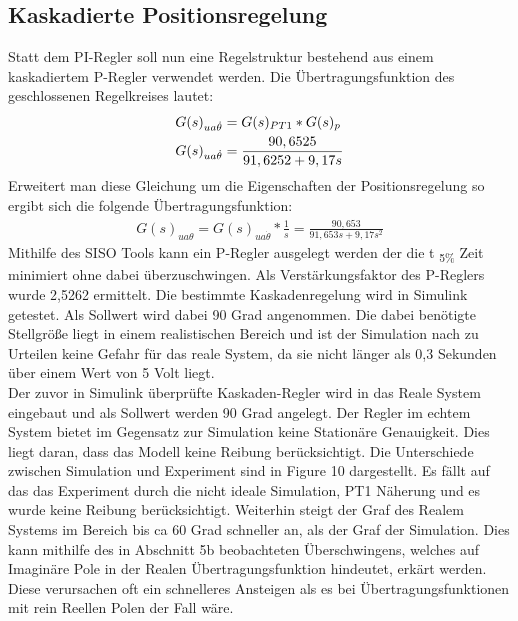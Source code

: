\documentclass[10pt]{scrartcl}
\begin{document}
\subsection{Kaskadierte Positionsregelung}
Statt dem PI-Regler soll nun eine Regelstruktur bestehend aus einem kaskadiertem P-Regler verwendet werden. Die Übertragungsfunktion des geschlossenen Regelkreises lautet:
\begin{align}
G(s)_{ua\dot{\theta}}&=G(s)_{PT1}*G(s)_{p} \notag \\
   G(s)_{ua\dot{\theta}}&=\frac{90,6525}{91,6252+9,17s}
\end{align} 
Erweitert man diese Gleichung um die Eigenschaften der Positionsregelung so ergibt sich die folgende Übertragungsfunktion:
\begin{align}
G(s)_{ ua\theta}=G(s)_{ua\dot{\theta}}*\frac{1}{s} = \frac{90,653}{91,653s+9,17s^2}
\end{align}
Mithilfe des SISO Tools kann ein P-Regler ausgelegt werden der die t \textsubscript{5\%} Zeit minimiert ohne dabei überzuschwingen. 
Als Verstärkungsfaktor des P-Reglers wurde 2,5262 ermittelt.
Die bestimmte Kaskadenregelung wird in Simulink getestet. Als Sollwert wird dabei 90 Grad angenommen. Die dabei benötigte Stellgröße liegt in einem realistischen Bereich und ist der Simulation nach zu Urteilen keine Gefahr für das reale System, da sie nicht länger als 0,3 Sekunden über einem Wert von 5 Volt liegt.\\
Der zuvor in Simulink überprüfte Kaskaden-Regler wird in das Reale System eingebaut und als Sollwert werden 90 Grad angelegt. Der Regler im echtem System bietet im Gegensatz zur Simulation keine Stationäre Genauigkeit. Dies liegt daran, dass das Modell keine Reibung berücksichtigt.
Die Unterschiede zwischen Simulation und Experiment sind in Figure 10 dargestellt. Es fällt auf das das Experiment durch die nicht ideale Simulation, PT1 Näherung und es wurde keine Reibung berücksichtigt. Weiterhin steigt der Graf des Realem Systems im Bereich bis ca 60 Grad schneller an, als der Graf der Simulation. Dies kann mithilfe des in Abschnitt 5b beobachteten Überschwingens, welches auf Imaginäre Pole in der Realen Übertragungsfunktion hindeutet, erkärt werden. Diese verursachen oft ein schnelleres Ansteigen als es bei Übertragungsfunktionen mit rein Reellen Polen der Fall wäre.\\
\end{document}
